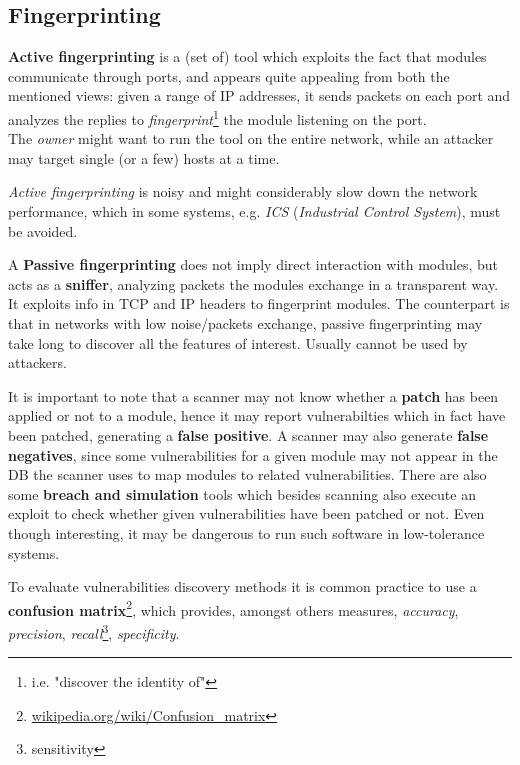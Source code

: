 \subsection{Fingerprinting}

\textbf{Active fingerprinting} is a (set of) tool which exploits the fact that modules communicate through ports, and appears quite appealing from both the mentioned views:
given a range of IP addresses, it sends packets on each port and analyzes the replies to \textit{fingerprint}\footnote{i.e. "discover the identity of"} the module listening on the port.\\
The \textit{owner} might want to run the tool on the entire network, while an attacker may target single (or a few) hosts at a time.


\textit{Active fingerprinting} is noisy and might considerably slow down the network performance, which in some systems, e.g. \textit{ICS} (\textit{Industrial Control System}), must be avoided.

A \textbf{Passive fingerprinting} does not imply direct interaction with modules, but acts as a \textbf{sniffer}, analyzing packets the modules exchange in a transparent way.
It exploits info in TCP and IP headers to fingerprint modules.
The counterpart is that in networks with low noise/packets exchange, passive fingerprinting may take long to discover all the features of interest.
Usually cannot be used by attackers.\nl

It is important to note that a scanner may not know whether a \textbf{patch} has been applied or not to a module,
hence it may report vulnerabilties which in fact have been patched, generating a \textbf{false positive}.
A scanner may also generate \textbf{false negatives}, since some vulnerabilities for a given module may not appear in the DB the scanner uses to map modules to related vulnerabilities.
There are also some \textbf{breach and simulation} tools which besides scanning also execute an exploit to check whether given vulnerabilities have been patched or not.
Even though interesting, it may be dangerous to run such software in low-tolerance systems.


To evaluate vulnerabilities discovery methods it is common practice to use a \textbf{confusion matrix}\footnote{\href{https://en.wikipedia.org/wiki/Confusion_matrix}{wikipedia.org/wiki/Confusion\_matrix}},
which provides, amongst others measures, \textit{accuracy}, \textit{precision}, \textit{recall}\footnote{sensitivity}, \textit{specificity}.\nl

